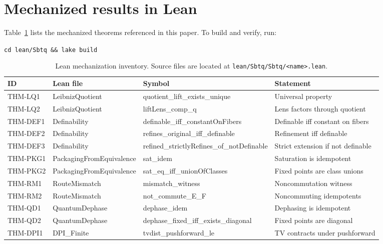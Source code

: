 \documentclass[11pt]{article}
\begin{document}
\appendix
\section{Mechanized results in Lean}\label{app:lean}

Table~\ref{tab:lean-inventory} lists the mechanized theorems referenced in this paper. To build and verify, run:

\medskip
\noindent\texttt{cd lean/Sbtq \&\& lake build}

\begin{table}[t]
  \centering
  \scriptsize
  \setlength{\tabcolsep}{4pt}
  \begin{tabular}{@{}llll@{}}
    \toprule
    ID & Lean file & Symbol & Statement \\
    \midrule
    THM-LQ1 & LeibnizQuotient & quotient\_lift\_exists\_unique & Universal property \\
    THM-LQ2 & LeibnizQuotient & liftLens\_comp\_q & Lens factors through quotient \\
    THM-DEF1 & Definability & definable\_iff\_constantOnFibers & Definable iff constant on fibers \\
    THM-DEF2 & Definability & refines\_original\_iff\_definable & Refinement iff definable \\
    THM-DEF3 & Definability & refined\_strictlyRefines\_of\_notDefinable & Strict extension if not definable \\
    THM-PKG1 & PackagingFromEquivalence & sat\_idem & Saturation is idempotent \\
    THM-PKG2 & PackagingFromEquivalence & sat\_eq\_iff\_unionOfClasses & Fixed points are class unions \\
    THM-RM1 & RouteMismatch & mismatch\_witness & Noncommutation witness \\
    THM-RM2 & RouteMismatch & not\_commute\_E\_F & Noncommuting idempotents \\
    THM-QD1 & QuantumDephase & dephase\_idem & Dephasing is idempotent \\
    THM-QD2 & QuantumDephase & dephase\_fixed\_iff\_exists\_diagonal & Fixed points are diagonal \\
    THM-DPI1 & DPI\_Finite & tvdist\_pushforward\_le & TV contracts under pushforward \\
    \bottomrule
  \end{tabular}
  \caption{Lean mechanization inventory. Source files are located at \texttt{lean/Sbtq/Sbtq/<name>.lean}.}
  \label{tab:lean-inventory}
\end{table}
\end{document}

